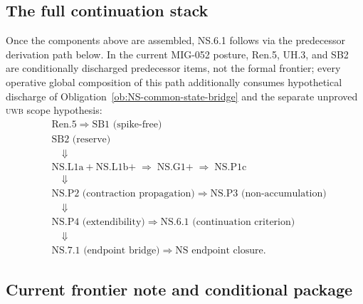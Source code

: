 \documentclass[12pt,oneside]{amsbook}
\theoremstyle{plain}
\theoremstyle{definition}
\theoremstyle{remark}
\begin{document}
\subsection{The full continuation stack}

Once the components above are assembled, NS.6.1 follows via the
predecessor derivation path below. In the current MIG-052 posture,
Ren.5, UH.3, and SB2 are conditionally discharged predecessor items,
not the formal frontier; every operative global composition of this
path additionally consumes hypothetical discharge of
Obligation~\ref{ob:NS-common-state-bridge} and the separate unproved
\textsc{uwb} scope hypothesis:
\begin{align*}
 &\text{Ren.5}
 \;\Rightarrow\; \text{SB1 (spike-free)} \\
 &\text{SB2 (reserve)}\\
 &\quad\Downarrow\\
 &\text{NS.L1a} + \text{NS.L1b+}
 \;\Rightarrow\; \text{NS.G1+}
 \;\Rightarrow\; \text{NS.P1c}\\
 &\quad\Downarrow\\
 &\text{NS.P2 (contraction propagation)}
 \;\Rightarrow\; \text{NS.P3 (non-accumulation)}\\
 &\quad\Downarrow\\
 &\text{NS.P4 (extendibility)}
 \;\Rightarrow\; \text{NS.6.1 (continuation criterion)}\\
 &\quad\Downarrow\\
 &\text{NS.7.1 (endpoint bridge)}
 \;\Rightarrow\; \text{NS endpoint closure.}
\end{align*}


\subsection{Current frontier note and conditional package}\label{sec:NS-conditional-package}
\end{document}
